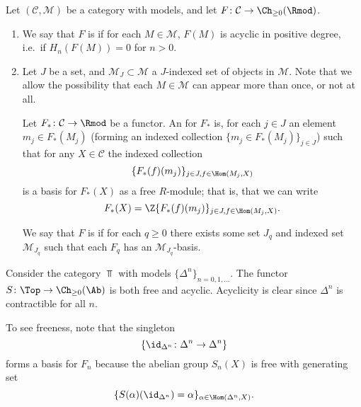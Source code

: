 \documentclass[main.tex]{subfiles}
\begin{document}
\begin{definition}
  \label{def:free_acyclic_functor}
  Let $(\mathcal{C}, \mathcal{M})$ be a category with models, and let $F\colon \mathcal{C} \to \Ch_{\geq 0}(\Rmod)$.

  \begin{enumerate}
    \item We say that $F$ is  if for each $M \in \mathcal{M}$, $F(M)$ is acyclic in positive degree, i.e.\ if $H_{n}(F(M)) = 0$ for $n > 0$.

    \item Let $J$ be a set, and $\mathcal{M}_{J} \subset \mathcal{M}$ a $J$-indexed set of objects in $\mathcal{M}$. Note that we allow the possibility that each $M \in \mathcal{M}$ can appear more than once, or not at all.
      
      Let $F_{*}\colon \mathcal{C} \to \Rmod$ be a functor. An  for $F_{*}$ is, for each $j \in J$ an element $m_{j} \in F_{*}(M_{j})$ (forming an indexed collection $\{m_{j} \in F_{*}(M_{j})\}_{j \in J}$) such that for any $X \in \mathcal{C}$ the indexed collection
      \begin{equation*}
        \{F_{*}(f)(m_{j})\}_{j \in J, f \in \Hom(M_{j}, X)}
      \end{equation*}
      is a basis for $F_{*}(X)$ as a free $R$-module; that is, that we can write
      \begin{equation*}
        F_{*}(X) = \Z\{F_{*}(f)(m_{j})\}_{j \in J, f \in \Hom(M_{j}, X)}.
      \end{equation*}
      
      We say that $F$ is  if for each $q \geq 0$ there exists some set $J_{q}$ and indexed set $\mathcal{M}_{J_{q}}$ such that each $F_{q}$ has an $\mathcal{M}_{J_{q}}$-basis.
  \end{enumerate}
\end{definition}

\begin{example}
  Consider the category $\Top$ with models $\{\Delta^{n}\}_{n = 0, 1, \ldots}$. The functor $S\colon \Top \to \Ch_{\geq 0}(\Ab)$ is both free and acyclic. Acyclicity is clear since $\Delta^{n}$ is contractible for all $n$. 
  
  To see freeness, note that the singleton
  \begin{equation*}
    \{\id_{\Delta^{n}}\colon \Delta^{n} \to \Delta^{n}\}
  \end{equation*}
  forms a basis for $F_{n}$ because the abelian group $S_{n}(X)$ is free with generating set
  \begin{equation*}
    \{S(\alpha)(\id_{\Delta^{n}}) = \alpha\}_{\alpha \in \Hom(\Delta^{n}, X)}.
  \end{equation*}
\end{example}
\end{document}
